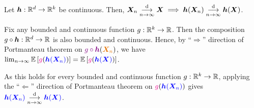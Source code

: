\begin{enumerate}
\begin{theorem}
\label{thm:cmt-id}
Let \(\bm{h}:\mathbb{R}^d\to\mathbb{R}^k\) be continuous. Then,
\(\bm{X}_n\underset{n\to\infty}{\overset{\text{d}}{\longrightarrow}}\bm{X}\implies
\bm{h}(\bm{X}_n)\underset{n\to\infty}{\overset{\text{d}}{\longrightarrow}}\bm{h}(\bm{X})\).
\end{theorem}
\begin{pf}
Fix any bounded and continuous function \(g:\mathbb{R}^k\to\mathbb{R}\). Then the composition
\(g\circ\bm{h}:\mathbb{R}^d\to\mathbb{R}\) is also bounded and continuous. Hence, by
``\(\Rightarrow\)'' direction of Portmanteau theorem on
\(\vc{g\circ\vect{h}}(\orc{\vect{X}_n})\), we have
\(\lim_{n\to\infty}\expv{\mgc{g}(\blc{\vect{h}(\vect{X}_n)})}
=\expv{\mgc{g}(\blc{\vect{h}(\vect{X})})}\).

As this holds for every bounded and continuous function \(g:\mathbb{R}^k\to\mathbb{R}\),
applying the ``\(\Leftarrow\)'' direction of Portmanteau theorem on
\(\mgc{g}(\blc{\vect{h}(\vect{X}_n)})\) gives
\(\blc{\vect{h}(\vect{X}_n)}\tod\blc{\vect{h}(\vect{X})}\).
\end{pf}
\end{enumerate}
